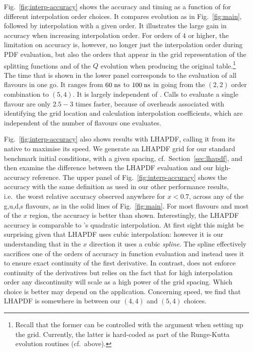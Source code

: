 Fig.~\ref{fig:interp-accuracy} shows the accuracy and timing as a
function of  for different interpolation order choices.
%
It compares evolution as in Fig.~\ref{fig:main}, followed by
interpolation with a given order.
%
It illustrates the large gain in accuracy when increasing
interpolation order.
%
For orders of $4$ or higher, the limitation on accuracy is, however,
no longer just the interpolation order during PDF evaluation, but also
the orders that appear in the grid representation of the splitting
functions and of the $Q$ evolution when producing the original
table.\footnote{Recall that the former can be controlled with the
   argument when setting up the grid.
  Currently, the latter is hard-coded as part of the Runge-Kutta
  evolution routines (cf.\ above).
}
%
The time that is shown in the lower panel corresponds to the
evaluation of all flavours in one go.
%
It ranges from $60\;\mathrm{ns}$ to $100\;\mathrm{ns}$ in going from the $(2,2)$ order
combination to $(5,4)$.
%
It is largely independent of .
%
Calls to evaluate a single flavour are only $2.5{-}3$ times faster,
because of overheads associated with identifying the grid location and
calculation interpolation coefficients, which are independent of the
number of flavours one evaluates.


Fig.~\ref{fig:interp-accuracy} also shows results with LHAPDF, calling
it from its native \CPP to maximise its speed.
%
We generate an LHAPDF grid for our standard benchmark initial
conditions, with a given  spacing, cf.\
Section~\ref{sec:lhapdf}, and then examine the difference between the
LHAPDF evaluation and our high-accuracy reference.
%
The upper panel of Fig.~\ref{fig:interp-accuracy} shows the accuracy
with the same definition as used in our other performance results,
i.e.\ the worst relative accuracy observed anywhere for $x < 0.7$,
across any of the g,u,d,s flavours, as in the solid lines of
Fig.~\ref{fig:main}.
%
For most flavours and most of the $x$ region, the accuracy is better
than shown.
%
Interestingly, the LHAPDF accuracy is comparable to \hoppet's
quadratic interpolation.
%
At first sight this might be surprising given that LHAPDF uses cubic
interpolation: however it is our understanding that in the $x$
direction it uses a cubic \emph{spline}.
%
The spline effectively sacrifices one of the orders of accuracy in
function evaluation and instead uses it to ensure exact continuity of
the first derivative.
%
In contrast, \hoppet does not enforce continuity of the derivatives
but relies on the fact that for high interpolation order any
discontinuity will scale as a high power of the grid spacing.
%
Which choice is better may depend on the application. 
%
Concerning speed, we find that LHAPDF is somewhere in between our
$(4,4)$ and $(5,4)$ choices.

